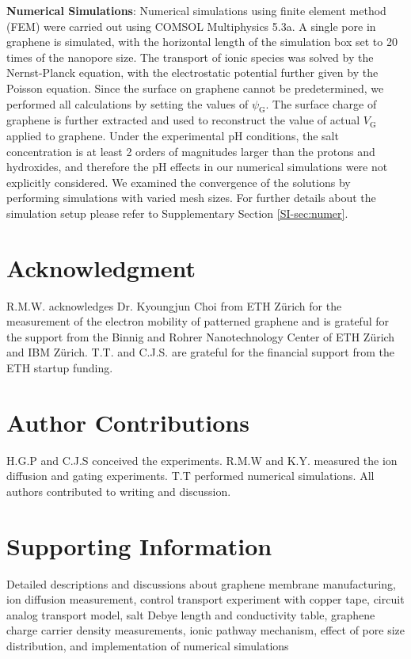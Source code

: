 \documentclass[journal=nalefd,email=true, hyperref=true, keywords=false]{achemso}
\begin{document}
\vspace{1em}
\noindent
\textbf{Numerical Simulations}: Numerical simulations using finite
element method (FEM) were carried out using COMSOL Multiphysics
5.3a. A single pore in graphene is simulated, with the horizontal
length of the simulation box set to 20 times of the nanopore size. The
transport of ionic species was solved by the Nernst-Planck equation,
with the electrostatic potential further given by the Poisson
equation. Since the surface on graphene cannot be predetermined, we
performed all calculations by setting the values of
$\psi_{\mathrm{G}}$. The surface charge of graphene is further
extracted and used to reconstruct the value of actual $V_{\mathrm{G}}$
applied to graphene. 
{
Under the experimental pH conditions, the salt concentration is at least 2 orders of magnitudes larger than the protons and hydroxides, and therefore the pH effects in our numerical simulations were not explicitly considered.
}
We examined the convergence of the solutions by
performing simulations with varied mesh sizes. For further details
about the simulation setup please refer to Supplementary Section
\ref{SI-sec:numer}.


\section*{Acknowledgment}
\label{sec:acknowledgment}


  R.M.W. acknowledges Dr. Kyoungjun Choi from ETH Z\"{u}rich for the measurement of the electron mobility 
  of patterned graphene and is grateful for the support from the Binnig and Rohrer
  Nanotechnology Center of ETH Z\"{u}rich and IBM Z\"{u}rich. T.T. and
  C.J.S. are grateful for the financial support from the ETH startup
  funding. 


\section{Author Contributions}
\label{sec:author}

H.G.P and C.J.S conceived the experiments. R.M.W and K.Y. measured the ion
diffusion and gating experiments. T.T performed numerical
simulations. All authors contributed to writing and discussion.

\section{Supporting Information}
\label{sec:acknowledgment-1}
Detailed descriptions and discussions about graphene membrane
manufacturing, ion diffusion measurement, control transport
experiment with copper tape, circuit analog transport model, salt
Debye length and conductivity table, graphene charge carrier density
measurements, ionic pathway mechanism, effect of pore size
distribution, and implementation of numerical simulations
\end{document}
